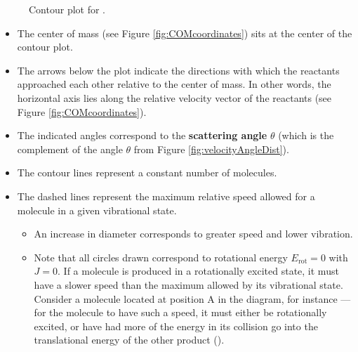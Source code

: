 \documentclass[../notes.tex]{subfiles}
\begin{document}
\begin{itemize}
\begin{figure}[h!]
        \caption{Contour plot for .}
        \label{fig:ContourPlotFD2}
    \end{figure}
    \begin{itemize}
        \item The center of mass (see Figure \ref{fig:COMcoordinates}) sits at the center of the contour plot.
        \item The arrows below the plot indicate the directions with which the reactants approached each other relative to the center of mass. In other words, the horizontal axis lies along the relative velocity vector of the reactants (see Figure \ref{fig:COMcoordinates}).
        \item The indicated angles correspond to the \textbf{scattering angle} $\theta$ (which is the complement of the angle $\theta$ from Figure \ref{fig:velocityAngleDist}).
        \item The contour lines represent a constant number of  molecules.
        \item The dashed lines represent the maximum relative speed allowed for a  molecule in a given vibrational state.
        \begin{itemize}
            \item An increase in diameter corresponds to greater speed and lower vibration.
            \item Note that all circles drawn correspond to rotational energy $E_\text{rot}=0$ with $J=0$. If a molecule is produced in a rotationally excited state, it must have a slower speed than the maximum allowed by its vibrational state. Consider a molecule located at position A in the diagram, for instance --- for the molecule to have such a speed, it must either be rotationally excited, or have had more of the energy in its collision go into the translational energy of the other product ().
        \end{itemize}

\end{itemize}
\end{itemize}
\end{document}
